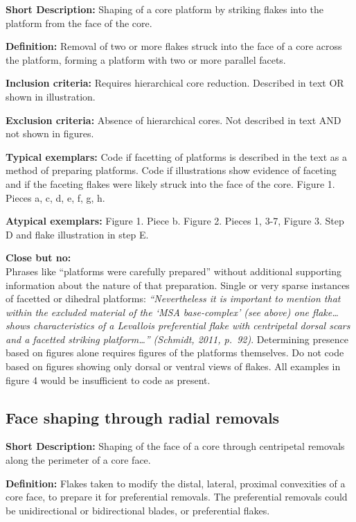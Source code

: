 \documentclass[
]{article}
\begin{document}
\textbf{Short Description:} Shaping of a core platform by striking
flakes into the platform from the face of the core.

\textbf{Definition:} Removal of two or more flakes struck into the face
of a core across the platform, forming a platform with two or more
parallel facets.

\textbf{Inclusion criteria:} Requires hierarchical core reduction.
Described in text OR shown in illustration.

\textbf{Exclusion criteria:} Absence of hierarchical cores. Not
described in text AND not shown in figures.

\textbf{Typical exemplars:} Code if facetting of platforms is described
in the text as a method of preparing platforms. Code if illustrations
show evidence of faceting and if the faceting flakes were likely struck
into the face of the core. Figure 1. Pieces a, c, d, e, f, g, h.

\textbf{Atypical exemplars:} Figure 1. Piece b. Figure 2. Pieces 1, 3-7,
Figure 3. Step D and flake illustration in step E.

\textbf{Close but no:}\\
Phrases like ``platforms were carefully prepared'' without additional
supporting information about the nature of that preparation. Single or
very sparse instances of facetted or dihedral platforms:
\emph{``Nevertheless it is important to mention that within the excluded
material of the `MSA base-complex' (see above) one flake\ldots{} shows
characteristics of a Levallois preferential flake with centripetal
dorsal scars and a facetted striking platform\ldots{}'' (Schmidt, 2011,
p.~92)}. Determining presence based on figures alone requires figures of
the platforms themselves. Do not code based on figures showing only
dorsal or ventral views of flakes. All examples in figure 4 would be
insufficient to code as present.

\subsection{Face shaping through radial
removals}\label{face-shaping-through-radial-removals}

\textbf{Short Description:} Shaping of the face of a core through
centripetal removals along the perimeter of a core face.

\textbf{Definition:} Flakes taken to modify the distal, lateral,
proximal convexities of a core face, to prepare it for preferential
removals. The preferential removals could be unidirectional or
bidirectional blades, or preferential flakes.
\end{document}
